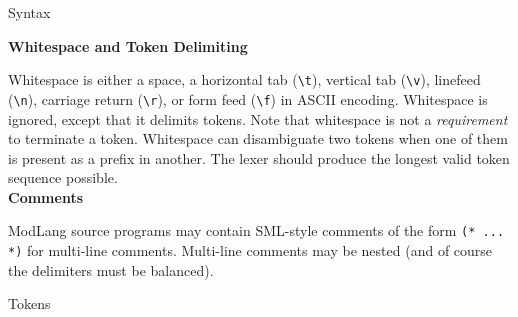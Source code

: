 \documentclass[11pt]{article}
\begin{document}
\begin{section}{Syntax}

\textbf{Whitespace and Token Delimiting} 

\medskip Whitespace is either a space, a horizontal tab (\verb|\t|), vertical tab (\verb|\v|), linefeed (\verb|\n|), carriage return (\verb|\r|), or form feed (\verb|\f|) in ASCII encoding. Whitespace is ignored, except that it delimits tokens. Note that whitespace is not a \emph{requirement} to terminate a token. Whitespace can disambiguate two tokens when one of them is present as a prefix in another. The lexer should produce the longest valid token sequence possible.\\

\textbf{Comments}

\medskip ModLang source programs may contain SML-style comments of the form \verb|(* ... *)| for multi-line comments. Multi-line comments may be nested (and of course the delimiters must be balanced).\\

\begin{subsection}{Tokens}


\end{subsection}
\end{section}
\end{document}
